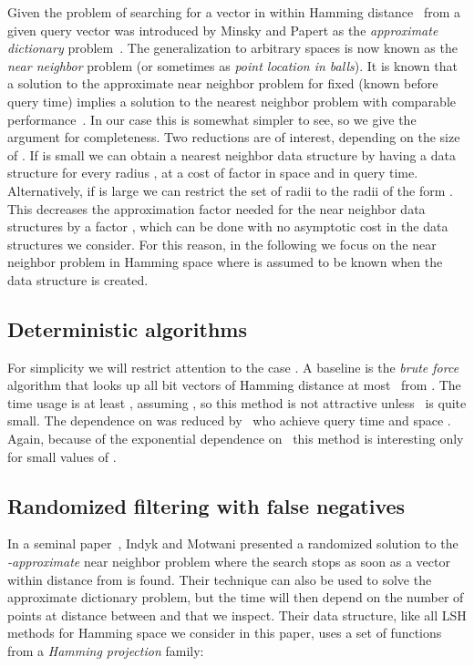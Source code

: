 \documentclass[prodmode,acmtalg]{acmsmall}
\begin{document}
Given  the problem of searching for a vector in  within Hamming distance~ from a given query vector  was introduced by Minsky and Papert as the \emph{approximate dictionary} problem~\cite{minsky1987perceptrons}.
The generalization to arbitrary spaces is now known as the \emph{near neighbor} problem (or sometimes as \emph{point location in balls}).
It is known that a solution to the approximate near neighbor problem for fixed  (known before query time) implies a solution to the nearest neighbor problem with comparable performance~\cite{Indyk1998,HarPeled2012}.
In our case this is somewhat simpler to see, so we give the argument for completeness.
Two reductions are of interest, depending on the size of .
If  is small we can obtain a nearest neighbor data structure by having a data structure for every radius , at a cost of factor  in space and  in query time.
Alternatively, if  is large we can restrict the set of radii to the  radii of the form .
This decreases the approximation factor needed for the near neighbor data structures by a factor , which can be done with no asymptotic cost in the data structures we consider.
For this reason, in the following we focus on the near neighbor problem in Hamming space where  is assumed to be known when the data structure is created.


\subsection{Deterministic algorithms}


For simplicity we will restrict attention to the case .
A baseline is the \emph{brute force} algorithm that looks up all  bit vectors of Hamming distance at most~ from .
The time usage is at least , assuming , so this method is not attractive unless~ is quite small.
The dependence on  was reduced by~\cite{Cole:2004:DMI:1007352.1007374} who achieve query time  and space .
Again, because of the exponential dependence on~ this method is interesting only for small values of .



\subsection{Randomized filtering with false negatives}\label{sec:lsh}

In a seminal paper~\cite{Indyk1998}, Indyk and Motwani presented 
a randomized solution to the \emph{-approximate} near neighbor problem where the search stops as soon as a vector within distance  from  is found.
Their technique can also be used to solve the approximate dictionary problem, but the time will then depend on the number of points at distance between  and  that we inspect.
Their data structure, like all LSH methods for Hamming space we consider in this paper, uses a set of functions from a \emph{Hamming projection} family:
\end{document}
